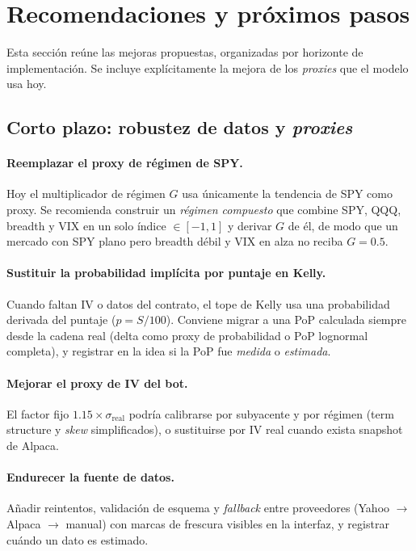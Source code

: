 \documentclass[11pt,letterpaper]{article}
\begin{document}
\section{Recomendaciones y próximos pasos}

Esta sección reúne las mejoras propuestas, organizadas por horizonte de
implementación. Se incluye explícitamente la mejora de los \emph{proxies} que el
modelo usa hoy.

\subsection{Corto plazo: robustez de datos y \emph{proxies}}

\paragraph{Reemplazar el proxy de régimen de SPY.}
Hoy el multiplicador de régimen $G$ usa únicamente la tendencia de SPY como
proxy. Se recomienda construir un \emph{régimen compuesto} que combine SPY, QQQ,
breadth y VIX en un solo índice $\in[-1,1]$ y derivar $G$ de él, de modo que un
mercado con SPY plano pero breadth débil y VIX en alza no reciba $G=0.5$.

\paragraph{Sustituir la probabilidad implícita por puntaje en Kelly.}
Cuando faltan IV o datos del contrato, el tope de Kelly usa una probabilidad
derivada del puntaje ($p=S/100$). Conviene migrar a una PoP calculada siempre
desde la cadena real (delta como proxy de probabilidad o PoP lognormal completa),
y registrar en la idea si la PoP fue \emph{medida} o \emph{estimada}.

\paragraph{Mejorar el proxy de IV del bot.}
El factor fijo $1.15\times\sigma_{\text{real}}$ podría calibrarse por subyacente
y por régimen (term structure y \emph{skew} simplificados), o sustituirse por IV
real cuando exista snapshot de Alpaca.

\paragraph{Endurecer la fuente de datos.}
Añadir reintentos, validación de esquema y \emph{fallback} entre proveedores
(Yahoo $\rightarrow$ Alpaca $\rightarrow$ manual) con marcas de frescura visibles
en la interfaz, y registrar cuándo un dato es estimado.
\end{document}
